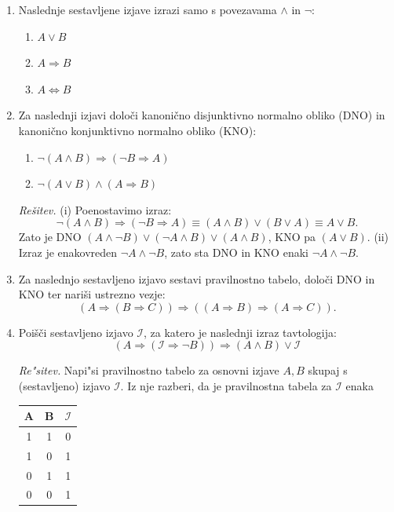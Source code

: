 \documentclass[11pt,paper=b5,DIV=13,headinclude,footinclude]{scrbook}
\begin{document}
\begin{enumerate}
\begin{enumerate}
\item {\color{blue}Artur: »Ni res, da je Klara oproda.«
Bine: »Klara je vitez ali pa sem jaz vitez.«
Klara: »Bine je oproda.«}
\item {\color{blue}Artur: »Klara ali Bine sta oprodi.«
Bine: »Cene in Artur sta viteza.«}
\end{enumerate}
\item {\color{blue}Naslednje sestavljene izjave izrazi samo s povezavama
$\wedge$ in $\neg$:}
\begin{enumerate}
\item {\color{blue}$A\vee B$}
\item {\color{blue}$A\Rightarrow B$}
\item {\color{blue}$A\Leftrightarrow B$}
\end{enumerate}


\item {\color{blue}Za naslednji izjavi določi kanonično disjunktivno normalno
obliko (DNO) in kanonično konjunktivno normalno obliko (KNO):}
\begin{enumerate}
\item[(i)] $\neg(A\wedge B) \Rightarrow (\neg B \Rightarrow A)$
\item[(ii)] $\neg (A\vee B) \wedge (A \Rightarrow B)$
\end{enumerate}

\emph{Rešitev.} (i) Poenostavimo izraz:
$$\neg(A\land B)\Rightarrow(\neg B\Rightarrow A)
\equiv (A\land B)\lor(B\lor A)\equiv A\lor B.$$
Zato je DNO $(A\land\neg B)\lor(\neg A\land B)\lor(A\land B)$,
KNO pa $(A\lor B)$. (ii) Izraz je enakovreden $\neg A\land\neg B$,
zato sta DNO in KNO enaki $\neg A\land\neg B$.

\item {\color{blue}Za naslednjo sestavljeno izjavo sestavi pravilnostno tabelo,
določi DNO in KNO ter nariši ustrezno vezje:}
$$
(A \Rightarrow (B\Rightarrow C)) \Rightarrow ((A\Rightarrow B)\Rightarrow (A \Rightarrow C)).
$$


\item {\color{blue}Poišči sestavljeno izjavo $\mathcal{I}$, za katero je
naslednji izraz tavtologija:}
$$(A\Rightarrow (\mathcal{I} \Rightarrow \neg B))\Rightarrow (A\wedge B) \vee \mathcal{I}$$

\emph{Re"sitev.} Napi"si pravilnostno tabelo za osnovni izjave $A, B$ skupaj s (sestavljeno) izjavo $\mathcal{I}$. Iz nje razberi, da je pravilnostna tabela za $\mathcal{I}$ enaka
\begin{table}[ht!]
\centering
\begin{tabular}{c|c|c}
A & B & $\mathcal{I}$\\
\hline
1 & 1 & 0\\
1 & 0 & 1\\
0 & 1 & 1\\
0 & 0 & 1
\end{tabular}
\end{table}


\end{enumerate}
\end{document}
